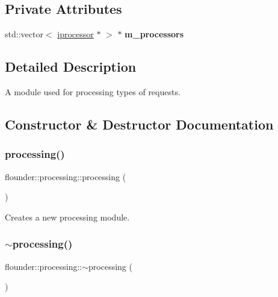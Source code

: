 \subsection*{Private Attributes}
\begin{DoxyCompactItemize}
\item 
\mbox{\label{classflounder_1_1processing_a77870c9b9e04569dc459767d11c47da5}} 
std\+::vector$<$ \hyperlink{classflounder_1_1iprocessor}{iprocessor} $\ast$ $>$ $\ast$ {\bfseries m\+\_\+processors}
\end{DoxyCompactItemize}


\subsection{Detailed Description}
A module used for processing types of requests. 



\subsection{Constructor \& Destructor Documentation}
\mbox{\label{classflounder_1_1processing_a1e1e4e71f153a05c6ff7eeef4c745500}} 
\subsubsection{\texorpdfstring{processing()}{processing()}}
{\footnotesize\ttfamily flounder\+::processing\+::processing (\begin{DoxyParamCaption}{ }\end{DoxyParamCaption})}



Creates a new processing module. 

\mbox{\label{classflounder_1_1processing_ad36e9f1f3ba3ae1cbf101333c03fd0c7}} 
\subsubsection{\texorpdfstring{$\sim$processing()}{~processing()}}
{\footnotesize\ttfamily flounder\+::processing\+::$\sim$processing (\begin{DoxyParamCaption}{ }\end{DoxyParamCaption})}



